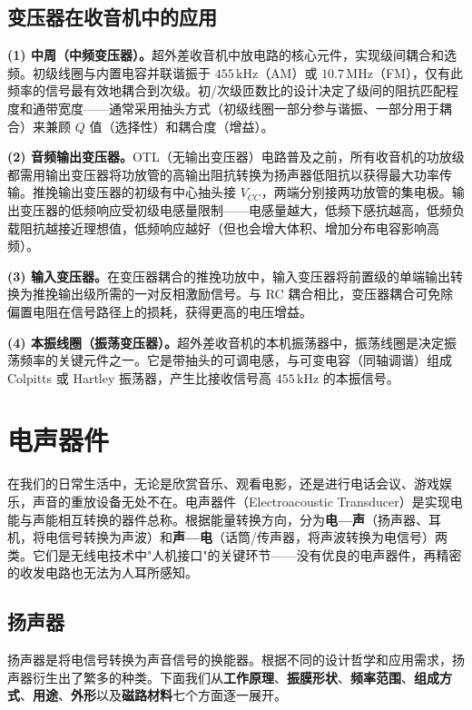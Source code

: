 \documentclass[12pt,UTF8]{ctexbook}
\begin{document}
\subsection{变压器在收音机中的应用}

\textbf{(1) 中周（中频变压器）。}超外差收音机中放电路的核心元件，实现级间耦合和选频。初级线圈与内置电容并联谐振于 $455\,\mathrm{kHz}$（AM）或 $10.7\,\mathrm{MHz}$（FM），仅有此频率的信号最有效地耦合到次级。初/次级匝数比的设计决定了级间的阻抗匹配程度和通带宽度——通常采用抽头方式（初级线圈一部分参与谐振、一部分用于耦合）来兼顾 $Q$ 值（选择性）和耦合度（增益）。

\textbf{(2) 音频输出变压器。}OTL（无输出变压器）电路普及之前，所有收音机的功放级都需用输出变压器将功放管的高输出阻抗转换为扬声器低阻抗以获得最大功率传输。推挽输出变压器的初级有中心抽头接 $V_{CC}$，两端分别接两功放管的集电极。输出变压器的低频响应受初级电感量限制——电感量越大，低频下感抗越高，低频负载阻抗越接近理想值，低频响应越好（但也会增大体积、增加分布电容影响高频）。

\textbf{(3) 输入变压器。}在变压器耦合的推挽功放中，输入变压器将前置级的单端输出转换为推挽输出级所需的一对反相激励信号。与 RC 耦合相比，变压器耦合可免除偏置电阻在信号路径上的损耗，获得更高的电压增益。

\textbf{(4) 本振线圈（振荡变压器）。}超外差收音机的本机振荡器中，振荡线圈是决定振荡频率的关键元件之一。它是带抽头的可调电感，与可变电容（同轴调谐）组成 Colpitts 或 Hartley 振荡器，产生比接收信号高 $455\,\mathrm{kHz}$ 的本振信号。

\section{电声器件}
\label{sec:electroacoustic}

在我们的日常生活中，无论是欣赏音乐、观看电影，还是进行电话会议、游戏娱乐，声音的重放设备无处不在。电声器件（Electroacoustic Transducer）是实现电能与声能相互转换的器件总称。根据能量转换方向，分为\textbf{电—声}（扬声器、耳机，将电信号转换为声波）和\textbf{声—电}（话筒/传声器，将声波转换为电信号）两类。它们是无线电技术中"人机接口"的关键环节——没有优良的电声器件，再精密的收发电路也无法为人耳所感知。

\subsection{扬声器}

扬声器是将电信号转换为声音信号的换能器。根据不同的设计哲学和应用需求，扬声器衍生出了繁多的种类。下面我们从\textbf{工作原理}、\textbf{振膜形状}、\textbf{频率范围}、\textbf{组成方式}、\textbf{用途}、\textbf{外形}以及\textbf{磁路材料}七个方面逐一展开。
\end{document}
